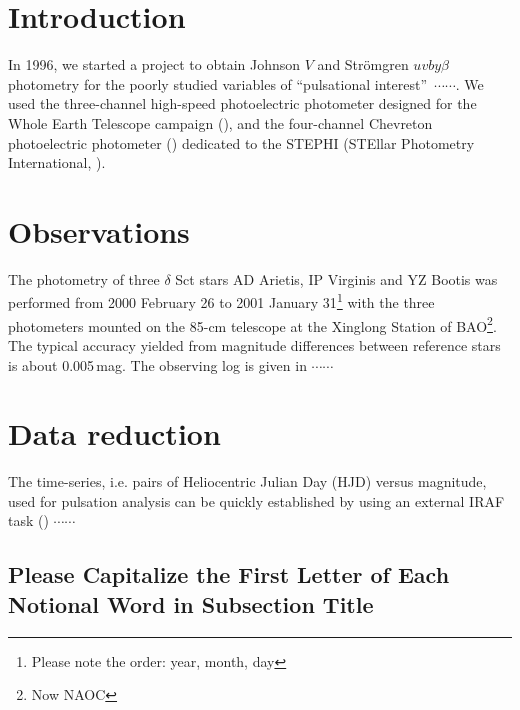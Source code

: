 \documentclass[referee]{raa}            %
\begin{document}
%
%
\section{Introduction}           %
\label{sect:intro}

In 1996, we started a project to obtain Johnson $V$ and Str\"{o}mgren
$uvby\beta$ photometry for the poorly studied variables of
``pulsational interest''~$\cdots\cdots$.
We used the three-channel high-speed photoelectric photometer designed for
the Whole Earth Telescope campaign
(\citealt{Nather+etal+1990, Jiang+Hu+1998}),
and the four-channel Chevreton photoelectric photometer
(\citealt{Michel+etal+1990, Michel+etal+1992}) dedicated to
the STEPHI (STEllar Photometry International, \citealt{Michel+etal+1992}).



\section{Observations}
\label{sect:Obs}

The photometry of three $\delta$ Sct stars AD Arietis, IP Virginis and
YZ Bootis was performed from 2000 February 26 to
2001 January 31\footnote{Please note the order: year, month, day}
with the three photometers mounted on the 85-cm telescope at
the Xinglong Station of BAO\footnote{Now NAOC}.
The typical accuracy yielded from magnitude differences between
reference stars is about 0.005\,mag.
The observing log is given in $\cdots\cdots$


\section{Data reduction}
\label{sect:data}

The time-series, i.e. pairs of Heliocentric Julian Day (HJD) versus magnitude,
used for pulsation analysis can be quickly established by using
an external IRAF task (\citealt{Zhou+etal+2001}) $\cdots\cdots$


\subsection{Please Capitalize the First Letter of Each Notional Word in Subsection Title}
\end{document}
